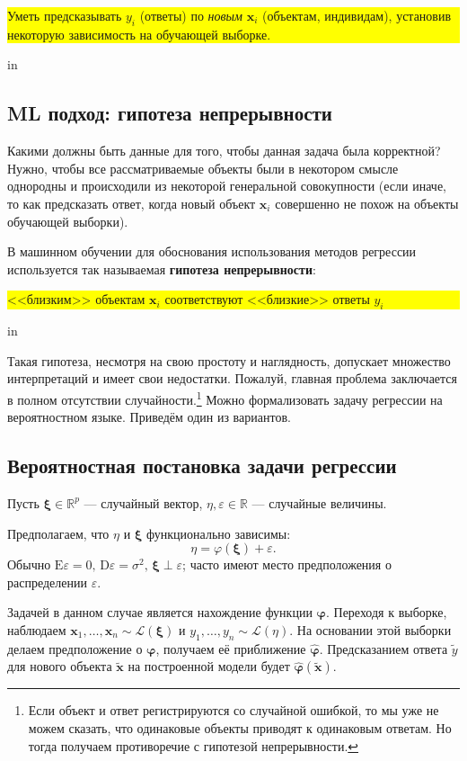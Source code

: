 \documentclass[12pt,a4paper,final]{article}
\newcommand{\E}{\mathrm{E}}
\newcommand{\D}{\mathrm{D}}
\newcommand{\1}{\mathds{1}}
\begin{document}
\colorbox{yellow}{\parbox{\textwidth}{ Уметь предсказывать $y_i$ (ответы) по \textit{новым} $\mathbf x_i$ (объектам, индивидам), установив некоторую зависимость на обучающей выборке. }}
 in 
\subsection{ML подход: гипотеза непрерывности}
\noindent Какими должны быть данные для того, чтобы данная задача была корректной? Нужно, чтобы все рассматриваемые объекты были в некотором смысле однородны и происходили из некоторой генеральной совокупности (если иначе, то как предсказать ответ, когда новый объект $\mathbf x_i$ совершенно не похож на объекты обучающей выборки).

В машинном обучении для обоснования использования методов регрессии используется так называемая \textbf{гипотеза непрерывности}:

\colorbox{yellow}{\parbox{\textwidth}{ <<близким>> объектам $\mathbf x_i$ соответствуют <<близкие>> ответы $y_i$}}
 in 

\noindent Такая гипотеза, несмотря на свою простоту и наглядность, допускает множество интерпретаций и имеет свои недостатки.
Пожалуй, главная проблема заключается в полном отсутствии случайности.\footnote{Если объект и ответ регистрируются со случайной ошибкой, то мы уже не можем сказать, что одинаковые объекты приводят к одинаковым ответам. Но тогда получаем противоречие с гипотезой непрерывности.} 
Можно формализовать задачу регрессии на вероятностном языке. Приведём один из вариантов.

\subsection{Вероятностная постановка задачи регрессии}
Пусть $\bm \xi \in \mathbb R^p$ --- случайный вектор, $\eta, \varepsilon \in \mathbb R$ --- случайные величины.

Предполагаем, что $\eta$ и $\bm \xi$ функционально зависимы: 
\begin{equation}
  \eta = \varphi(\bm \xi) + \varepsilon.
\end{equation}
Обычно $\E \varepsilon = 0, \, \D \varepsilon = \sigma^2,\, \bm\xi \perp \varepsilon$; часто имеют место предположения о распределении $\varepsilon$. 

Задачей в данном случае является нахождение функции $\bm \varphi$.
Переходя к выборке, наблюдаем $\mathbf x_1, \ldots, \mathbf x_n \sim \mathcal L(\bm \xi)$ и $y_1, \ldots, y_n \sim \mathcal L(\eta)$. На основании этой выборки делаем предположение о $\bm \varphi$, получаем её приближение $\hat{\bm{\varphi}}$. Предсказанием ответа $\tilde y$ для нового объекта $\tilde{\mathbf{x}}$ на построенной модели будет $\hat{\bm{\varphi}}(\tilde{\mathbf{x}}).$  
\end{document}
